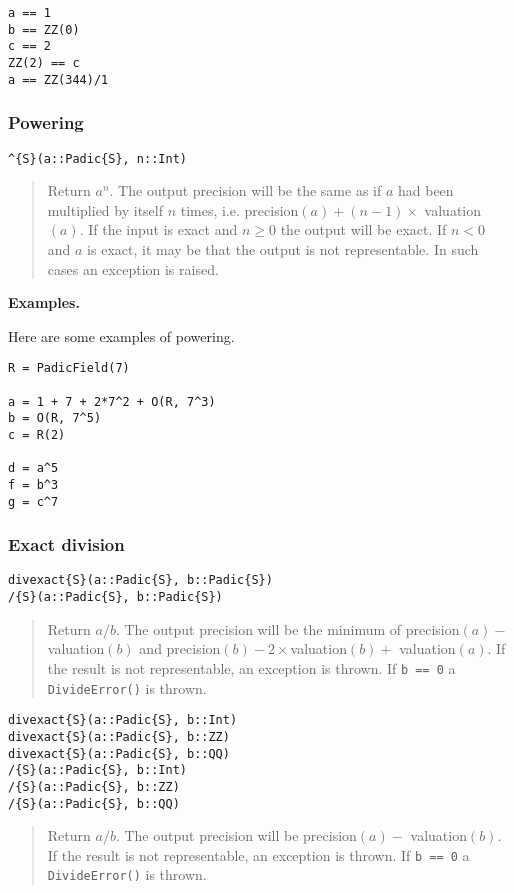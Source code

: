 \documentclass[a4paper,10pt]{article}
\newcommand{\code}{\lstinline}
\newcommand{\desc}[1]{\vspace{-3mm}\begin{quote}#1\end{quote}}
\begin{document}
{{\begin{lstlisting}
a == 1
b == ZZ(0)
c == 2
ZZ(2) == c
a == ZZ(344)/1
\end{lstlisting}

\subsubsection{Powering}

\begin{lstlisting}
^{S}(a::Padic{S}, n::Int)
\end{lstlisting}

\desc{Return $a^n$. The output precision will be the same as if $a$ had been
multiplied by itself $n$ times, i.e. precision$(a) + (n - 1)\times$
valuation$(a)$. If the input is exact and $n \geq 0$ the output will be
exact. If $n < 0$ and $a$ is exact, it may be that the output is not
representable. In such cases an exception is raised.}

\textbf{Examples.}

Here are some examples of powering.

\begin{lstlisting}
R = PadicField(7)

a = 1 + 7 + 2*7^2 + O(R, 7^3)
b = O(R, 7^5)
c = R(2)

d = a^5
f = b^3
g = c^7
\end{lstlisting}

\subsubsection{Exact division}

\begin{lstlisting}
divexact{S}(a::Padic{S}, b::Padic{S})
/{S}(a::Padic{S}, b::Padic{S})
\end{lstlisting}

\desc{Return $a/b$. The output precision will be the minimum of 
precision$(a) -$ valuation$(b)$ and precision$(b) - 2\times$valuation$(b) +$
valuation$(a)$. If the result is not representable, an exception is
thrown. If \code{b == 0} a \code{DivideError()} is thrown.}

\begin{lstlisting}
divexact{S}(a::Padic{S}, b::Int)
divexact{S}(a::Padic{S}, b::ZZ)
divexact{S}(a::Padic{S}, b::QQ)
/{S}(a::Padic{S}, b::Int)
/{S}(a::Padic{S}, b::ZZ)
/{S}(a::Padic{S}, b::QQ)
\end{lstlisting}

\desc{Return $a/b$. The output precision will be precision$(a) -$ 
valuation$(b)$. If the result is not representable, an exception is
thrown. If \code{b == 0} a \code{DivideError()} is thrown.}

}}
\end{document}
